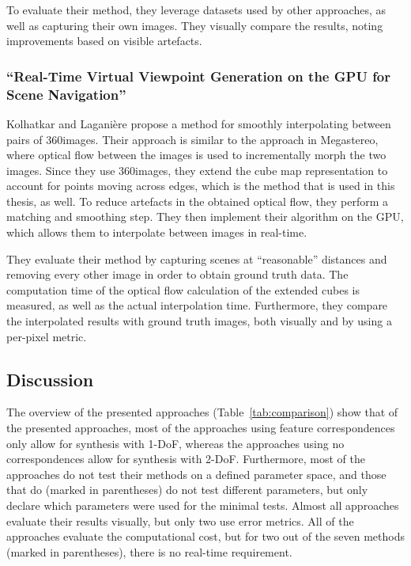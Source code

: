To evaluate their method, they leverage datasets used by other approaches, as well as capturing their own images. They visually compare the results, noting improvements based on visible artefacts.



\subsubsection{``Real-Time Virtual Viewpoint Generation on the GPU for Scene Navigation'' \cite{360flowblending}}
Kolhatkar and Lagani\`ere \cite{360flowblending} propose a method for smoothly interpolating between pairs of 360\degree images.
Their approach is similar to the approach in Megastereo, where optical flow between the images is used to incrementally morph the two images. Since they use 360\degree images, they extend the cube map representation to account for points moving across edges, which is the method that is used in this thesis, as well. To reduce artefacts in the obtained optical flow, they perform a matching and smoothing step. They then implement their algorithm on the GPU, which allows them to interpolate between images in real-time. 

They evaluate their method by capturing scenes at ``reasonable'' distances and removing every other image in order to obtain ground truth data. The computation time of the optical flow calculation of the extended cubes is measured, as well as the actual interpolation time. Furthermore, they compare the interpolated results with ground truth images, both visually and by using a per-pixel metric.

\subsection{Discussion}
The overview of the presented approaches (Table~\ref{tab:comparison}) show that of the presented approaches, most of the approaches using feature correspondences only allow for synthesis with 1-DoF, whereas the approaches using no correspondences allow for synthesis with 2-DoF. Furthermore, most of the approaches do not test their methods on a defined parameter space, and those that do (marked in parentheses) do not test different parameters, but only declare which parameters were used for the minimal tests. Almost all approaches evaluate their results visually, but only two use error metrics. All of the approaches evaluate the computational cost, but for two out of the seven methods (marked in parentheses), there is no real-time requirement.


